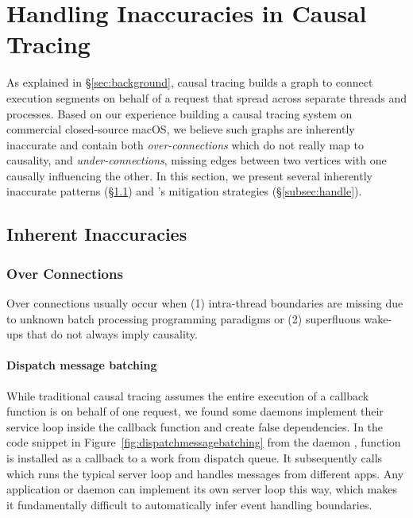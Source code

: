 \section{Handling Inaccuracies in Causal Tracing}\label{sec:inaccuracy}

As explained in \S\ref{sec:background}, causal tracing builds a graph to connect
execution segments on behalf of a request that spread across separate threads
and processes. Based on our experience building a causal tracing system on
commercial closed-source macOS, we believe such graphs are inherently inaccurate
and contain both \emph{over-connections} which do not really map to
causality, and \emph{under-connections}, missing edges between two vertices
with one causally influencing the other. In this section, we present
several inherently inaccurate patterns (\S\ref{subsec:pattern}) and \xxx's
mitigation strategies (\S\ref{subsec:handle}).

\subsection{Inherent Inaccuracies} \label{subsec:pattern}



\subsubsection{Over Connections} \label{subsec:overconnections}

Over connections usually occur when (1) intra-thread boundaries are missing due
to unknown batch processing programming paradigms or (2) superfluous wake-ups
that do not always imply causality.

\paragraph{Dispatch message batching}

While traditional causal tracing assumes the entire execution of a callback
function is on behalf of one request, we found some daemons implement their
service loop inside the callback function and create false dependencies. In the
code snippet in Figure~\ref{fig:dispatchmessagebatching} from the 
daemon , function  is installed as a callback to
a work from dispatch queue. It subsequently calls 
which runs the typical server loop and handles messages from different apps. Any
application or daemon can implement its own server loop this way, which makes it
fundamentally difficult to automatically infer event handling boundaries.

